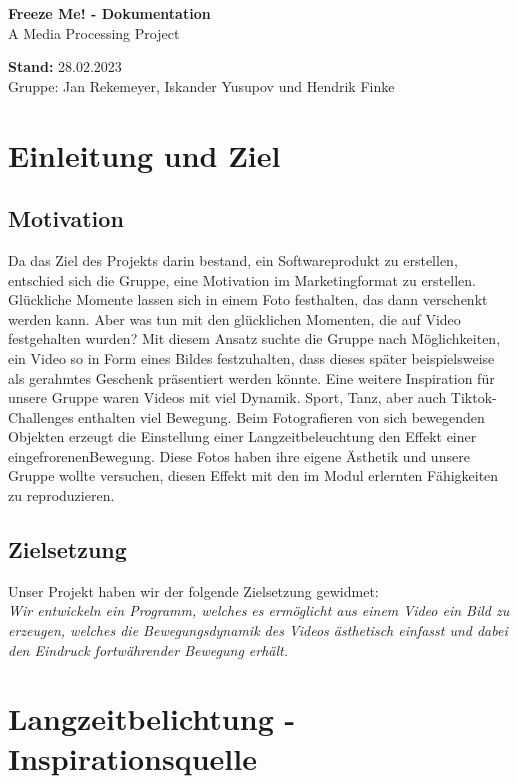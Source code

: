 \documentclass[12pt]{scrartcl}
\begin{document}
\hspace{-0.4cm}\huge \textbf{Freeze Me! - Dokumentation}\vspace{3pt}\\\Large A Media Processing Project \vspace{14pt}\large 

\noindent
\textbf{Stand:} 28.02.2023 \\ 

\vspace{3pt} \normalsize Gruppe: 
Jan Rekemeyer, Iskander Yusupov und Hendrik Finke

\section{Einleitung und Ziel} %
\subsection{Motivation}
Da das Ziel des Projekts darin bestand, ein Softwareprodukt zu erstellen, entschied sich die Gruppe, eine Motivation im Marketingformat zu erstellen.\\Gl\"uckliche Momente lassen sich in einem Foto festhalten, das dann verschenkt werden kann. Aber was tun mit den gl\"ucklichen Momenten, die auf Video festgehalten wurden? Mit diesem Ansatz suchte die Gruppe nach M\"oglichkeiten, ein Video so in Form eines Bildes festzuhalten, dass dieses sp\"ater beispielsweise als gerahmtes Geschenk pr\"asentiert werden k\"onnte.
Eine weitere Inspiration f\"ur unsere Gruppe waren Videos mit viel Dynamik. Sport, Tanz, aber auch Tiktok-Challenges enthalten viel Bewegung. Beim Fotografieren von sich bewegenden Objekten erzeugt die Einstellung einer Langzeitbeleuchtung den Effekt einer \glqq eingefrorenen\grqq  Bewegung. Diese Fotos haben ihre eigene \"Asthetik und unsere Gruppe wollte versuchen, diesen Effekt mit den im Modul erlernten F\"ahigkeiten zu reproduzieren.
\subsection{Zielsetzung}Unser Projekt haben wir der folgende Zielsetzung gewidmet: \\
\textit{Wir entwickeln ein Programm, welches es erm\"oglicht aus einem Video ein Bild zu erzeugen, welches die Bewegungsdynamik des Videos \"asthetisch einfasst und dabei den Eindruck fortw\"ahrender Bewegung erh\"alt.}

\section{Langzeitbelichtung - Inspirationsquelle} %
\end{document}

